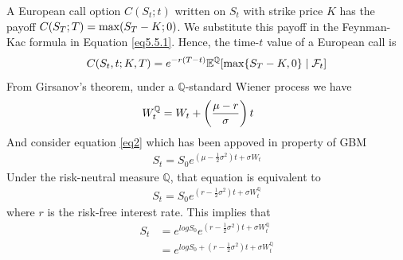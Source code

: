 \indent A European call option $C(S_t; t)$ written on $S_t$ with strike
price $K$ has the payoff $C(S_T ; T) = \textnormal {max}(S_T-K; 0)$. We substitute this payoff
in the Feynman-Kac formula in Equation \eqref{eq5.5.1}. Hence, the time-$t$ value of a
European call is
\begin{align*}
	C(S_t,t;K,T) = e^{-r(T-t)}\mathbb{E}^\mathbb{Q}[\textnormal{max}\{S_T-K,0\}\mid\mathcal{F}_t]
\end{align*}
%
From Girsanov's theorem, under a $\mathbb{Q}$-standard Wiener process we have
\begin{align*}
W_t^\mathbb{Q}&=W_t+\left(\dfrac{\mu-r}{\sigma}\right)t \hspace{0.2cm} 
\end{align*}
And consider equation \eqref{eq2} which has been appoved in property of GBM
\begin{align*}
S_t=S_0e^{\left(\mu -\frac{1}{2}\sigma^2 \right)t+\sigma W_t}
\end{align*}
Under the risk-neutral measure $\mathbb{Q}$, that equation is equivalent to
\begin{align}
S_t=S_0e^{\left(r -\frac{1}{2}\sigma^2 \right)t+\sigma W_t^{\mathbb{Q}}} \label{eq5.5.2}
\end{align} 
where $r$ is the risk-free interest rate. This implies that
\begin{align*}
S_t&=e^{logS_0}e^{\left(r -\frac{1}{2}\sigma^2 \right)t+\sigma W_t^{\mathbb{Q}}}\\
&=e^{logS_0+\left(r -\frac{1}{2}\sigma^2 \right)t+\sigma W_t^{\mathbb{Q}}}
\end{align*}

